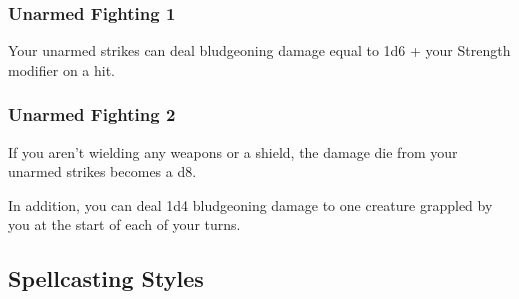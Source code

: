 \subsubsection{Unarmed Fighting 1}
    Your unarmed strikes can deal bludgeoning damage equal to 1d6 + your Strength modifier on a hit.
\subsubsection{Unarmed Fighting 2}
    If you aren't wielding any weapons or a shield, the damage die from your unarmed strikes becomes a d8.

    In addition, you can deal 1d4 bludgeoning damage to one creature grappled by you at the start of each of your turns.

\subsection*{Spellcasting Styles} \label{ssec::spellcastingstyles}




